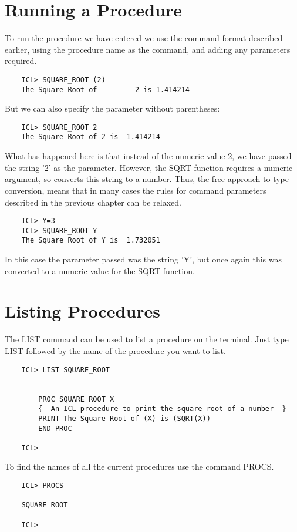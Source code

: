 \documentclass[twoside,11pt]{report}
\newcommand{\xlabel}[1]{}
\begin{document}
\section{\xlabel{running_a_procedure}Running a Procedure}
To run the procedure we have entered we use the command format described
earlier, using the procedure name as the command, and adding any parameters
required.
\begin{verbatim}
    ICL> SQUARE_ROOT (2)
    The Square Root of         2 is 1.414214
\end{verbatim}
But we can also specify the parameter without parentheses:
\begin{verbatim}
    ICL> SQUARE_ROOT 2
    The Square Root of 2 is  1.414214
\end{verbatim}
What has happened here is that instead of the numeric value 2, we have
passed the string '2' as the parameter. However, the SQRT function requires
a numeric argument, so converts this string to a number. Thus, the free
approach to type conversion, means that in many cases the rules for command
parameters described in the previous chapter can be relaxed.
\begin{verbatim}
    ICL> Y=3
    ICL> SQUARE_ROOT Y
    The Square Root of Y is  1.732051
\end{verbatim}
In this case the parameter passed was the string 'Y', but once again this
was converted to a numeric value for the SQRT function.
\section{\xlabel{listing_procedures}Listing Procedures}
The LIST command can be used to list a procedure on the terminal. Just type
LIST followed by the name of the procedure you want to list.
\begin{verbatim}
    ICL> LIST SQUARE_ROOT


        PROC SQUARE_ROOT X
        {  An ICL procedure to print the square root of a number  }
        PRINT The Square Root of (X) is (SQRT(X))
        END PROC

    ICL>
\end{verbatim}
To find the names of all the current procedures use the command PROCS.
\begin{verbatim}
    ICL> PROCS

    SQUARE_ROOT

    ICL> 
\end{verbatim}
\end{document}
